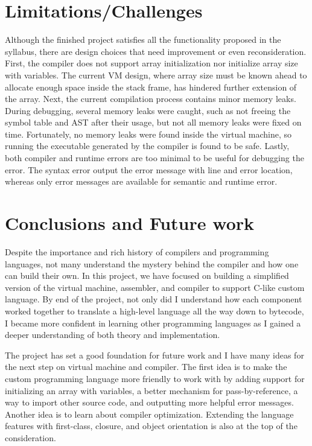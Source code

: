 \documentclass[manuscript,screen,nonacm]{acmart}
\begin{document}
\section{Limitations/Challenges}
Although the finished project satisfies all the functionality proposed in the syllabus, there are design choices that need improvement or even reconsideration. First, the compiler does not support array initialization nor initialize array size with variables. The current VM design, where array size must be known ahead to allocate enough space inside the stack frame, has hindered further extension of the array. Next, the current compilation process contains minor memory leaks. During debugging, several memory leaks were caught, such as not freeing the symbol table and AST after their usage, but not all memory leaks were fixed on time. Fortunately, no memory leaks were found inside the virtual machine, so running the executable generated by the compiler is found to be safe. Lastly, both compiler and runtime errors are too minimal to be useful for debugging the error. The syntax error output the error message with line and error location, whereas only error messages are available for semantic and runtime error. 


\section{Conclusions and Future work}
Despite the importance and rich history of compilers and programming languages, not many understand the mystery behind the compiler and how one can build their own. In this project, we have focused on building a simplified version of the virtual machine, assembler, and compiler to support C-like custom language. By end of the project, not only did I understand how each component worked together to translate a high-level language all the way down to bytecode, I became more confident in learning other programming languages as I gained a deeper understanding of both theory and implementation. 

The project has set a good foundation for future work and I have many ideas for the next step on virtual machine and compiler. The first idea is to make the custom programming language more friendly to work with by adding support for initializing an array with variables, a better mechanism for pass-by-reference, a way to import other source code, and outputting more helpful error messages. Another idea is to learn about compiler optimization. Extending the language features with first-class, closure, and object orientation is also at the top of the consideration.
\end{document}
